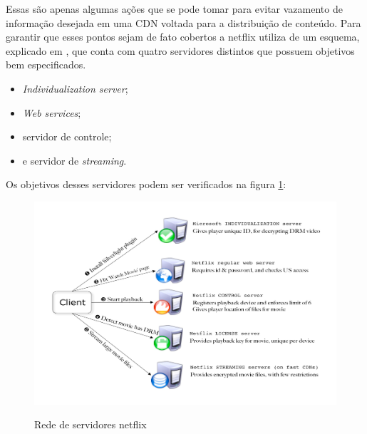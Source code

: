 Essas s\~ao apenas algumas a\c{c}\~oes que se pode tomar para evitar vazamento de informa\c{c}\~ao desejada em uma CDN voltada para a distribui\c{c}\~ao de conte\'udo.
\newline
Para garantir que esses pontos sejam de fato cobertos a netflix utiliza de um esquema, explicado em \cite{pomelo2009analysis}, que conta com quatro servidores distintos que possuem objetivos bem especificados.
\begin{itemize}
\item \textit{Individualization server};
\item \textit{Web services};
\item servidor de controle;
\item e servidor de \textit{streaming}.  
\end{itemize}
Os objetivos desses servidores podem ser verificados na figura \ref{figura:servidores_netflix}:
\begin{figure}[H]
\caption{Rede de servidores netflix}
\includegraphics[width=14cm]{Figuras/servidores_netflix.png} 
\label{figura:servidores_netflix}
\end{figure}